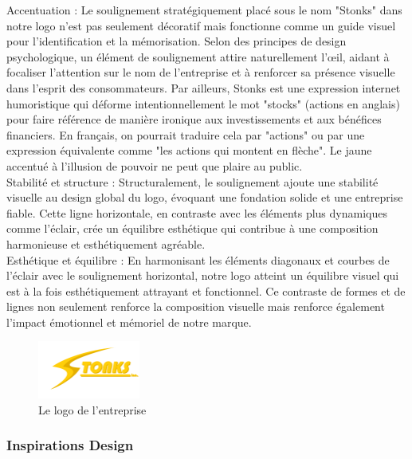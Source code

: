 Accentuation : Le soulignement stratégiquement placé sous le nom "Stonks" dans notre logo n'est pas seulement décoratif mais fonctionne comme un guide visuel pour l'identification et la mémorisation.
Selon des principes de design psychologique, un élément de soulignement attire naturellement l'œil, aidant à focaliser l'attention sur le nom de l'entreprise et à renforcer sa présence visuelle dans l'esprit des consommateurs.
Par ailleurs, Stonks est une expression internet humoristique qui déforme intentionnellement le mot "stocks" (actions en anglais) pour faire référence de manière ironique aux investissements et aux bénéfices financiers.
En français, on pourrait traduire cela par "actions" ou par une expression équivalente comme "les actions qui montent en flèche". Le jaune accentué à l'illusion de pouvoir ne peut que plaire au public.
\\

Stabilité et structure : Structuralement, le soulignement ajoute une stabilité visuelle au design global du logo, évoquant une fondation solide et une entreprise fiable.
Cette ligne horizontale, en contraste avec les éléments plus dynamiques comme l'éclair, crée un équilibre esthétique qui contribue à une composition harmonieuse et esthétiquement agréable.
\\

Esthétique et équilibre : En harmonisant les éléments diagonaux et courbes de l'éclair avec le soulignement horizontal, notre logo atteint un équilibre visuel qui est à la fois esthétiquement attrayant et fonctionnel.
Ce contraste de formes et de lignes non seulement renforce la composition visuelle mais renforce également l'impact émotionnel et mémoriel de notre marque.

\begin{figure}[H]
      \centering
      \includegraphics[width=0.3\textwidth]{assets/logo_stonks.png}
      \caption{Le logo de l'entreprise}
      \label{fig:website1}
  \end{figure}

\subsubsection{Inspirations Design}

